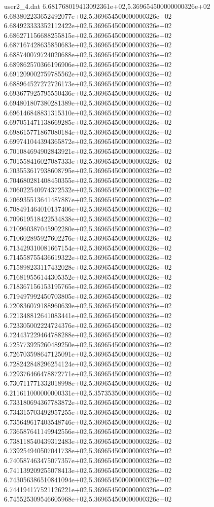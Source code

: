 \begin{filecontents}{user2_4.dat}
6.681768019413092361e+02,5.369654500000000326e+02
6.683802233652492077e+02,5.369654500000000326e+02
6.684923333352112422e+02,5.369654500000000326e+02
6.686271156688255815e+02,5.369654500000000326e+02
6.687167428635850683e+02,5.369654500000000326e+02
6.688740079724020688e+02,5.369654500000000326e+02
6.689862570366196906e+02,5.369654500000000326e+02
6.691209002759785562e+02,5.369654500000000326e+02
6.688964527272726173e+02,5.369654500000000326e+02
6.693677925795550436e+02,5.369654500000000326e+02
6.694801807380281389e+02,5.369654500000000326e+02
6.696146848831315310e+02,5.369654500000000326e+02
6.697051471138669285e+02,5.369654500000000326e+02
6.698615771867080184e+02,5.369654500000000326e+02
6.699741044394365872e+02,5.369654500000000326e+02
6.701084694902843921e+02,5.369654500000000326e+02
6.701558416027087333e+02,5.369654500000000326e+02
6.703553617938608795e+02,5.369654500000000326e+02
6.704680281408450355e+02,5.369654500000000326e+02
6.706022540974372532e+02,5.369654500000000326e+02
6.706935513641487887e+02,5.369654500000000326e+02
6.708491464010137406e+02,5.369654500000000326e+02
6.709619518422534838e+02,5.369654500000000326e+02
6.710960387045902280e+02,5.369654500000000326e+02
6.710602895927602276e+02,5.369654500000000326e+02
6.713429310081667154e+02,5.369654500000000326e+02
6.714558755436619322e+02,5.369654500000000326e+02
6.715898233117432028e+02,5.369654500000000326e+02
6.716819556144305352e+02,5.369654500000000326e+02
6.718367156153195765e+02,5.369654500000000326e+02
6.719497992450703805e+02,5.369654500000000326e+02
6.720836079188960639e+02,5.369654500000000326e+02
6.721348812641083441e+02,5.369654500000000326e+02
6.723305002224724376e+02,5.369654500000000326e+02
6.724437229464788288e+02,5.369654500000000326e+02
6.725773925260489250e+02,5.369654500000000326e+02
6.726703598647125091e+02,5.369654500000000326e+02
6.728242848296254124e+02,5.369654500000000326e+02
6.729376466478872771e+02,5.369654500000000326e+02
6.730711771332018998e+02,5.369654500000000326e+02
6.211611000000000331e+02,5.357353500000000395e+02
6.733180694367783872e+02,5.369654500000000326e+02
6.734315703492957255e+02,5.369654500000000326e+02
6.735649617403548746e+02,5.369654500000000326e+02
6.736587641149942556e+02,5.369654500000000326e+02
6.738118540439312483e+02,5.369654500000000326e+02
6.739254940507041738e+02,5.369654500000000326e+02
6.740587463475077357e+02,5.369654500000000326e+02
6.741139209255078413e+02,5.369654500000000326e+02
6.743056386510841094e+02,5.369654500000000326e+02
6.744194177521126221e+02,5.369654500000000326e+02
6.745525309546605968e+02,5.369654500000000326e+02

\end{filecontents}
